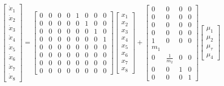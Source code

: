\documentclass{UoNMCHA}
\numberwithin{equation}{section}
\begin{document}
	$$
	\left[\begin{array}{c}
	\dot{x}_{1} \\
	\dot{x}_{2} \\
	\dot{x}_{3} \\
	\dot{x}_{4} \\
	\dot{x}_{5} \\
	\dot{x}_{6} \\
	\dot{x}_{7} \\
	\dot{x}_{8}
	\end{array}\right]=\left[\begin{array}{llllllll}
	0 & 0 & 0 & 0 & 1 & 0 & 0 & 0 \\
	0 & 0 & 0 & 0 & 0 & 1 & 0 & 0 \\
	0 & 0 & 0 & 0 & 0 & 0 & 1 & 0 \\
	0 & 0 & 0 & 0 & 0 & 0 & 0 & 1 \\
	0 & 0 & 0 & 0 & 0 & 0 & 0 & 0 \\
	0 & 0 & 0 & 0 & 0 & 0 & 0 & 0 \\
	0 & 0 & 0 & 0 & 0 & 0 & 0 & 0 \\
	0 & 0 & 0 & 0 & 0 & 0 & 0 & 0
	\end{array}\right]\left[\begin{array}{c}
	x_{1} \\
	x_{2} \\
	x_{3} \\
	x_{4} \\
	x_{5} \\
	x_{6} \\
	x_{7} \\
	x_{8}
	\end{array}\right]+\left[\begin{array}{cccc}
	0 & 0 & 0 & 0 \\
	0 & 0 & 0 & 0 \\
	0 & 0 & 0 & 0 \\
	0 & 0 & 0 & 0 \\
	1 & 0 & 0 & 0 \\
	m_{1} & & & \\
	0 & \frac{1}{m_{2}} & 0 & 0 \\
	0 & 0 & 1 & 0 \\
	0 & 0 & 0 & 1
	\end{array}\right]\left[\begin{array}{c}
	\mu_{1} \\
	\mu_{2} \\
	\mu_{\tau} \\
	\mu_{4}
	\end{array}\right]
	$$
	
\end{document}
